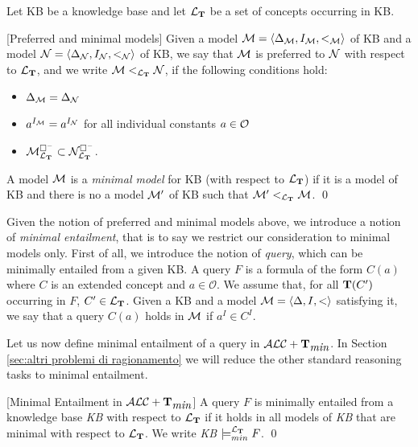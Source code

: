 \documentclass[a4paper, 11pt, oneside]{duthesis}
\newcommand{\tip}{{\bf T}}
\newcommand{\alctmin}{\mathcal{ALC}+\tip_{\mbox{\em min}}}
\newcommand{\bbox}{\square}
\newcommand{\sx} {\langle}
\newcommand{\dx} {\rangle}
\newcommand{\ellet} {\mathcal{L}_{\bf T}}
\newcommand{\emme} {\begin{mathcal}M\end{mathcal}}
\newcommand{\enne} {\begin{mathcal}N\end{mathcal}}
\newenvironment{definition}
{\begin{defi} \rm}{\qed \end{defi}}
\newenvironment{definition}
{\begin{defi} \rm}{\qed \end{defi}}
\newtheorem{definition}{Definition}
\newcounter{posu}
\newtheorem{definition}[posu]{Definition}
\begin{document}
\noindent Let KB be a knowledge base and let ${\ellet}$ be a set of concepts occurring in KB.

\begin{definition}[Preferred and minimal models]\label{def preferred and minimal models}
Given a model $\emme=\sx \Delta_{\emme}, I_{\emme}, <_{\emme} \dx$ of KB and  a model $\enne=\sx \Delta_{\enne}, I_{\enne}, <_{\enne} \dx$ of KB, we say that $\emme$ is preferred to $\enne$ with respect to ${\ellet}$, and we write $\emme <_{\ellet} \enne$, if the following conditions hold:

\begin{itemize}
\item $\Delta_{\emme}=\Delta_{\enne}$
\item $a^{I_{\emme}}=a^{I_{\enne}}$ for all individual constants $a \in \begin{mathcal}O\end{mathcal}$
\item $\emme^{\bbox^-}_{\ellet} \subset \enne^{\bbox^-}_{\ellet}$.
\end{itemize}

\noindent A model $\emme$ is a \emph{minimal model} for KB (with respect to ${\ellet}$) if it is a model of KB and there is no a model $\emme'$ of KB such that $\emme' <_{\ellet} \emme$.
\end{definition}

\noindent Given the notion of preferred and minimal models above, we introduce a notion of \emph{minimal entailment}, that is to say we restrict our consideration to minimal models only.
First of all, we introduce the notion of \emph{query}, which can be minimally entailed from a given KB.
A query $F$ is  a formula of the form $C(a)$ where $C$ is an extended concept and $a \in \mathcal{O}$.
We assume that, for all $\tip(C')$ occurring in $F$, $C' \in \ellet$.
Given a KB and a model $\emme=\sx \Delta, I, < \dx$ satisfying it, we say that a query $C(a)$ holds in $\emme$ if $a^I \in C^I$.

Let us now define minimal entailment of a query in $\alctmin$.
In Section \ref{sec:altri problemi di ragionamento} we will reduce the other standard reasoning tasks to minimal entailment.

\begin{definition}[Minimal Entailment in $\alctmin$]\label{LogicalConsequenceALCTMIN}
A query $F$  is minimally entailed from a knowledge base \emph{KB} with respect to ${\ellet}$ if it holds in all models of \emph{KB} that are minimal with respect to ${\ellet}$.
We write \emph{KB} $\models_{min}^{\ellet} F$.
\end{definition}
\end{document}
